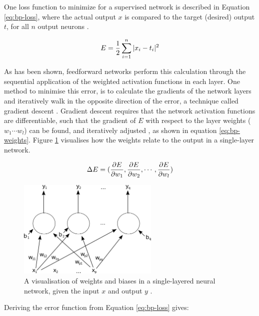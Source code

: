 \documentclass[report.tex]{subfiles}
\begin{document}
One loss function to minimize for a supervised network
is described in Equation \ref{eq:bp-loss},
where the actual output $x$ is compared to the 
target (desired) output $t$, for all $n$ output neurons
\cite{Russel2007}.

\begin{equation}
  E = {1 \over 2} \sum_{i=1}^n |x_i - t_i|^2
  \label{eq:bp-loss}
\end{equation}

As has been shown, feedforward networks perform this calculation
through the sequential application of the weighted activation
functions in each layer.
One method to minimise this error, is
to calculate the gradients of the network layers and iteratively walk in
the opposite direction of the error, a technique called gradient
descent \cite{Rumelhart1988, Russel2007}.
Gradient descent requires that the network
activation functions are differentiable,
such that the gradient of $E$ with respect to the layer weights
($w_1 \cdots w_l$) can be found, and iteratively
adjusted \cite{Rojas1996}, as shown in equation \ref{eq:bp-weights}.
Figure \ref{fig:ann_weights} visualises how the weights relate
to the output in a single-layer network.

\begin{equation}
  \Delta E = (
    {\partial E \over \partial w_1}, 
    {\partial E \over \partial w_2},
    \cdots, 
    {\partial E \over \partial w_l}
  )
  \label{eq:bp-weights}
\end{equation}

\begin{figure}
  \centering
  \includegraphics[width=0.6\textwidth]{images/ann.png}
  \caption{A visualisation of weights and biases in a single-layered neural
  network, given the input $x$ and output $y$ \cite{Mcstrother}.}
  \label{fig:ann_weights}
\end{figure}

Deriving the error function from Equation \ref{eq:bp-loss} gives:
\end{document}
